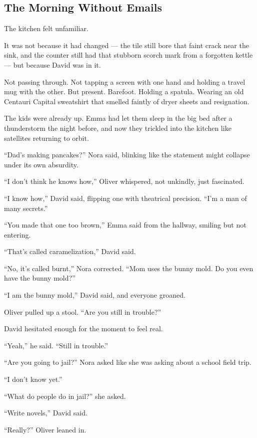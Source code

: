 
\subsection{The Morning Without Emails}

The kitchen felt unfamiliar.

It was not because it had changed --- the tile still bore that faint crack near the sink, and the 
counter still had that stubborn scorch mark from a forgotten kettle --- but because David was in it.

Not passing through. Not tapping a screen with one hand and holding a travel mug with the other.  
But present. Barefoot. Holding a spatula. Wearing an old Centauri Capital sweatshirt that smelled faintly 
of dryer sheets and resignation.

The kids were already up. Emma had let them sleep in the big bed after a thunderstorm the night before, 
and now they trickled into the kitchen like satellites returning to orbit.

``Dad’s making pancakes?'' Nora said, blinking like the statement might collapse under its own absurdity.

``I don’t think he knows how,'' Oliver whispered, not unkindly, just fascinated.

``I know how,'' David said, flipping one with theatrical precision. ``I’m a man of many secrets.''

``You made that one too brown,'' Emma said from the hallway, smiling but not entering.

``That’s called caramelization,'' David said.

``No, it’s called burnt,'' Nora corrected. ``Mom uses the bunny mold. Do you even have the bunny mold?''

``I am the bunny mold,'' David said, and everyone groaned.

Oliver pulled up a stool. ``Are you still in trouble?''

David hesitated enough for the moment to feel real.

``Yeah,'' he said. ``Still in trouble.''

``Are you going to jail?'' Nora asked like she was asking about a school 
field trip.

``I don’t know yet.''

``What do people do in jail?'' she asked.

``Write novels,'' David said.

``Really?'' Oliver leaned in.

